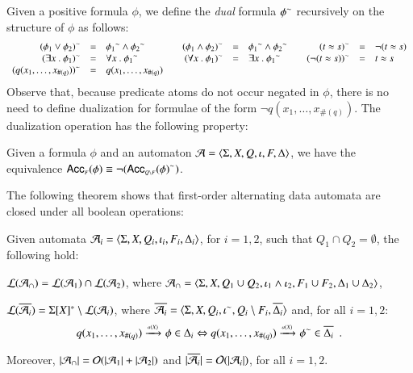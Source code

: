 \documentclass{llncs}
\begin{document}
Given a positive formula $\phi$, we define the \emph{dual} formula
${\phi}^{\sim}$ recursively on the structure of $\phi$ as follows: 
\[\begin{array}{rclcrclcrcl}
{(\phi_1 \vee \phi_2)}^{\sim} & = & {\phi_1}^{\sim} \wedge {\phi_2}^{\sim} && 
{(\phi_1 \wedge \phi_2)}^{\sim} & = & {\phi_1}^{\sim} \wedge {\phi_2}^{\sim} &&
{(t \approx s)}^{\sim} & = & \neg(t \approx s) \\
{(\exists x ~.~ \phi_1)}^{\sim} & = & \forall x ~.~ {\phi_1}^{\sim} && 
{(\forall x ~.~ \phi_1)}^{\sim} & = & \exists x ~.~ {\phi_1}^{\sim} && 
{(\neg(t \approx s))}^{\sim} & = & t \approx s \\
{(q(x_1,\ldots,x_{\#(q)}))}^{\sim} & = & q(x_1,\ldots,x_{\#(q)})
\end{array}\]
Observe that, because predicate atoms do not occur negated in $\phi$,
there is no need to define dualization for formulae of the form $\neg
q(x_1,\ldots,x_{\#(q)})$. The dualization operation has the following
property:
\begin{lemma}\label{lemma:dual}
  Given a formula $\phi$ and an automaton
  $\mathcal{A}=\langle \Sigma,X,Q,\iota,F,\Delta \rangle$, we have the equivalence
  $\mathsf{Acc}_{\scriptscriptstyle{F}}({\phi}) \equiv \neg({\mathsf{Acc}_{\scriptscriptstyle{Q\setminus F}}({\phi})}^{\sim})$. 
\end{lemma}

The following theorem shows that first-order alternating data automata
are closed under all boolean operations: 

\begin{theorem}\label{thm:closure}
  Given automata $\mathcal{A}_i = \langle \Sigma,X,Q_i,\iota_i,F_i,\Delta_i \rangle$,
  for $i=1,2$, such that $Q_1 \cap Q_2 = \emptyset$, the following hold: 
  \begin{compactitem}
    \item\label{it1:closure} ${\mathcal L}({\mathcal{A}_\cap}) = {\mathcal L}({\mathcal{A}_1}) \cap {\mathcal L}({\mathcal{A}_2})$, where
      $\mathcal{A}_\cap = \langle \Sigma,X,Q_1 \cup Q_2, \iota_1 \wedge \iota_2,
      F_1 \cup F_2, \Delta_1 \cup \Delta_2 \rangle$, 
    \item\label{it2:closure} ${\mathcal L}({\overline{\mathcal{A}_i}}) = \Sigma[X]^* \setminus
      {\mathcal L}({\mathcal{A}_i})$, where $\overline{\mathcal{A}_i} =
      \langle \Sigma,X,Q_i,{\iota}^{\sim},Q_i\setminus
        F_i,\overline{\Delta_i} \rangle$ and, for all
      $i=1,2$: \[q(x_1,\ldots,x_{\#(q)}) \xrightarrow{{\scriptscriptstyle a(X)}}_{{\scriptstyle }} \phi \in
      \Delta_i \Leftrightarrow q(x_1,\ldots,x_{\#(q)}) \xrightarrow{{\scriptscriptstyle a(X)}}_{{\scriptstyle }} {\phi}^{\sim}
      \in \overline{\Delta_i} \enspace.\]
  \end{compactitem}
  Moreover, ${|{\mathcal{A}_\cap}|} = \mathcal{O}({{|{\mathcal{A}_1}|}+{|{\mathcal{A}_2}|}})$ and
  ${|{\overline{\mathcal{A}_i}}|} = \mathcal{O}({{|{\mathcal{A}_i}|}})$, for all $i=1,2$.
\end{theorem}
\proof{\qed}
\end{document}
